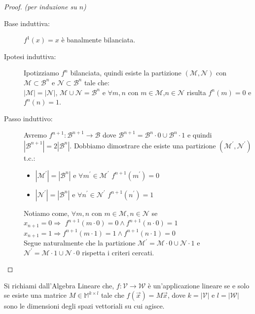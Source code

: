 \documentclass[12pt,a4paper,openright]{report}
\begin{document}
\begin{proof}
    \textit{(per induzione su $n$)\\}
    \begin{description}
        \item[Base induttiva:] $f^1(x)=x$ è banalmente bilanciata.
        \item[Ipotesi induttiva:] Ipotizziamo $f^n$ bilanciata, quindi esiste la partizione $(\mathcal{M},\mathcal{N})$ con $\mathcal{M}\subset\mathcal{B}^n$ e $\mathcal{N}\subset\mathcal{B}^n$ tale che:\\
                                      ${\left\vert{\mathcal{M}}\right\vert} = {\left\vert{\mathcal{N}}\right\vert}$, $\mathcal{M} \cup \mathcal{N} = \mathcal{B}^n$ e $\forall m,n$ con
                                      $m\in\mathcal{M}$,$n \in\mathcal{N}$ risulta $f^n(m) = 0$ e $ f^n(n) = 1$.
        \item[Passo induttivo:] Avremo $f^{n+1}:\mathcal{B}^{n+1}\rightarrow\mathcal{B}$ dove  $\mathcal{B}^{n+1} = \mathcal{B}^n\cdot0 \cup \mathcal{B}^n\cdot1$ e quindi\\
                                     $\left\vert\mathcal{B}^{n+1}\right\vert = 2\left\vert\mathcal{B}^{n}\right\vert$. Dobbiamo dimostrare che esiste una partizione
                                     $(\mathcal{M^\prime},\mathcal{N^\prime})$ t.c.:
                                     \begin{itemize}
                                        \item $\left\vert\mathcal{M^\prime}\right\vert=\left\vert\mathcal{B}^{n}\right\vert$ e $\forall m^\prime \in \mathcal{M^\prime}$ $f^{n+1}(m^\prime) = 0$ 
                                        \item $\left\vert\mathcal{N^\prime}\right\vert=\left\vert\mathcal{B}^{n}\right\vert$ e $\forall n^\prime \in \mathcal{N^\prime}$ $f^{n+1}(n^\prime) = 1$   
                                      \end{itemize}
                                      Notiamo come, $\forall m,n$ con $ m\in\mathcal{M},n\in\mathcal{N}$ se\\
                                      $x_{n+1} = 0 \Rightarrow $ $f^{n+1}(m\cdot0)=0 \land f^{n+1}(n\cdot0)=1$\\
                                      $x_{n+1} = 1 \Rightarrow $$f^{n+1}(m\cdot1)=1 \land f^{n+1}(n\cdot1)=0$\\
                                      Segue naturalmente che la partizione $\mathcal{M^\prime} = \mathcal{M}\cdot0 \cup \mathcal{N}\cdot1$ e $\mathcal{N^\prime} = \mathcal{M}\cdot1 \cup \mathcal{N}\cdot0$
                                      rispetta i criteri cercati. 
    \end{description}      
\end{proof}
\par
Si richiami dall'Algebra Lineare che, $f:\mathcal{V}\rightarrow\mathcal{W}$ è un'applicazione lineare se e solo se esiste una matrice $M \in \mathbb{M}^{k \times l}$ tale che $f(\vec{x})=M\vec{x}$, dove $k = \left\vert\mathcal{V}\right\vert$ e $l = \left\vert\mathcal{W}\right\vert$ sono le dimensioni degli spazi vettoriali su cui agisce.\\
\end{document}
